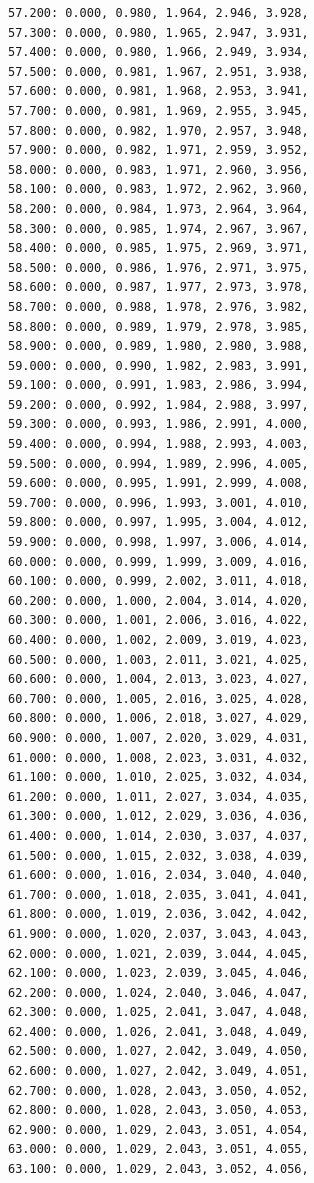 \documentclass[12pt, a4paper]{article}
\begin{document}
\begin{scriptsize}
\begin{ttfamily}
\begin{lstlisting}
57.200: 0.000, 0.980, 1.964, 2.946, 3.928, 
57.300: 0.000, 0.980, 1.965, 2.947, 3.931, 
57.400: 0.000, 0.980, 1.966, 2.949, 3.934, 
57.500: 0.000, 0.981, 1.967, 2.951, 3.938, 
57.600: 0.000, 0.981, 1.968, 2.953, 3.941, 
57.700: 0.000, 0.981, 1.969, 2.955, 3.945, 
57.800: 0.000, 0.982, 1.970, 2.957, 3.948, 
57.900: 0.000, 0.982, 1.971, 2.959, 3.952, 
58.000: 0.000, 0.983, 1.971, 2.960, 3.956, 
58.100: 0.000, 0.983, 1.972, 2.962, 3.960, 
58.200: 0.000, 0.984, 1.973, 2.964, 3.964, 
58.300: 0.000, 0.985, 1.974, 2.967, 3.967, 
58.400: 0.000, 0.985, 1.975, 2.969, 3.971, 
58.500: 0.000, 0.986, 1.976, 2.971, 3.975, 
58.600: 0.000, 0.987, 1.977, 2.973, 3.978, 
58.700: 0.000, 0.988, 1.978, 2.976, 3.982, 
58.800: 0.000, 0.989, 1.979, 2.978, 3.985, 
58.900: 0.000, 0.989, 1.980, 2.980, 3.988, 
59.000: 0.000, 0.990, 1.982, 2.983, 3.991, 
59.100: 0.000, 0.991, 1.983, 2.986, 3.994, 
59.200: 0.000, 0.992, 1.984, 2.988, 3.997, 
59.300: 0.000, 0.993, 1.986, 2.991, 4.000, 
59.400: 0.000, 0.994, 1.988, 2.993, 4.003, 
59.500: 0.000, 0.994, 1.989, 2.996, 4.005, 
59.600: 0.000, 0.995, 1.991, 2.999, 4.008, 
59.700: 0.000, 0.996, 1.993, 3.001, 4.010, 
59.800: 0.000, 0.997, 1.995, 3.004, 4.012, 
59.900: 0.000, 0.998, 1.997, 3.006, 4.014, 
60.000: 0.000, 0.999, 1.999, 3.009, 4.016, 
60.100: 0.000, 0.999, 2.002, 3.011, 4.018, 
60.200: 0.000, 1.000, 2.004, 3.014, 4.020, 
60.300: 0.000, 1.001, 2.006, 3.016, 4.022, 
60.400: 0.000, 1.002, 2.009, 3.019, 4.023, 
60.500: 0.000, 1.003, 2.011, 3.021, 4.025, 
60.600: 0.000, 1.004, 2.013, 3.023, 4.027, 
60.700: 0.000, 1.005, 2.016, 3.025, 4.028, 
60.800: 0.000, 1.006, 2.018, 3.027, 4.029, 
60.900: 0.000, 1.007, 2.020, 3.029, 4.031, 
61.000: 0.000, 1.008, 2.023, 3.031, 4.032, 
61.100: 0.000, 1.010, 2.025, 3.032, 4.034, 
61.200: 0.000, 1.011, 2.027, 3.034, 4.035, 
61.300: 0.000, 1.012, 2.029, 3.036, 4.036, 
61.400: 0.000, 1.014, 2.030, 3.037, 4.037, 
61.500: 0.000, 1.015, 2.032, 3.038, 4.039, 
61.600: 0.000, 1.016, 2.034, 3.040, 4.040, 
61.700: 0.000, 1.018, 2.035, 3.041, 4.041, 
61.800: 0.000, 1.019, 2.036, 3.042, 4.042, 
61.900: 0.000, 1.020, 2.037, 3.043, 4.043, 
62.000: 0.000, 1.021, 2.039, 3.044, 4.045, 
62.100: 0.000, 1.023, 2.039, 3.045, 4.046, 
62.200: 0.000, 1.024, 2.040, 3.046, 4.047, 
62.300: 0.000, 1.025, 2.041, 3.047, 4.048, 
62.400: 0.000, 1.026, 2.041, 3.048, 4.049, 
62.500: 0.000, 1.027, 2.042, 3.049, 4.050, 
62.600: 0.000, 1.027, 2.042, 3.049, 4.051, 
62.700: 0.000, 1.028, 2.043, 3.050, 4.052, 
62.800: 0.000, 1.028, 2.043, 3.050, 4.053, 
62.900: 0.000, 1.029, 2.043, 3.051, 4.054, 
63.000: 0.000, 1.029, 2.043, 3.051, 4.055, 
63.100: 0.000, 1.029, 2.043, 3.052, 4.056, 

\end{lstlisting}
\end{ttfamily}
\end{scriptsize}
\end{document}
